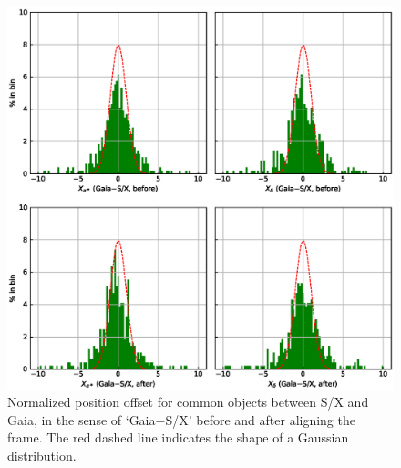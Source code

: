 \documentclass{aa}   %
\begin{document}
\begin{figure}[hbtp]
    \centering
    \includegraphics[width=160mm]{figs/nor-ra-dec-gdr2-sx-hist}
    \caption[]{\label{fig:nor-ra-dec-gdr2-sx-hist}
        Normalized position offset for common objects between S/X and Gaia, in the sense of `Gaia$-$S/X' before and after aligning the frame.
        The red dashed line indicates the shape of a Gaussian distribution.
    }
\end{figure}
\end{document}
